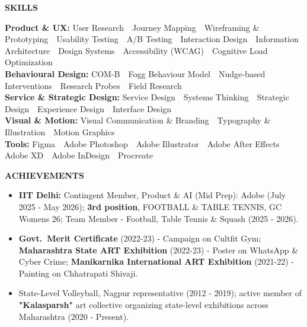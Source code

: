 \documentclass[10pt,a4paper]{article}
\newcommand{\cvsec}[1]{%
  \vspace{6pt}%
  {\color{accent}\large\bfseries\MakeUppercase{#1}}\par
  \vspace{1.5pt}{\color{ink}\hrule height 0.6pt}\vspace{4pt}\par
}
\begin{document}
\cvsec{Skills}

\textbf{Product \& UX:} User Research \,\textperiodcentered\, Journey Mapping \,\textperiodcentered\, Wireframing \& Prototyping \,\textperiodcentered\, Usability Testing \,\textperiodcentered\, A/B Testing \,\textperiodcentered\, Interaction Design \,\textperiodcentered\, Information Architecture \,\textperiodcentered\, Design Systems \,\textperiodcentered\, Accessibility (WCAG) \,\textperiodcentered\, Cognitive Load Optimization\\[3pt]
\textbf{Behavioural Design:} COM-B \,\textperiodcentered\, Fogg Behaviour Model \,\textperiodcentered\, Nudge-based Interventions \,\textperiodcentered\, Research Probes \,\textperiodcentered\, Field Research\\[3pt]
\textbf{Service \& Strategic Design:} Service Design \,\textperiodcentered\, Systems Thinking \,\textperiodcentered\, Strategic Design \,\textperiodcentered\, Experience Design \,\textperiodcentered\, Interface Design\\[3pt]
\textbf{Visual \& Motion:} Visual Communication \& Branding \,\textperiodcentered\, Typography \& Illustration \,\textperiodcentered\, Motion Graphics\\[3pt]
\textbf{Tools:} Figma \,\textperiodcentered\, Adobe Photoshop \,\textperiodcentered\, Adobe Illustrator \,\textperiodcentered\, Adobe After Effects \,\textperiodcentered\, Adobe XD \,\textperiodcentered\, Adobe InDesign \,\textperiodcentered\, Procreate

\cvsec{Achievements}

\begin{itemize}
  \item \textbf{IIT Delhi:} Contingent Member, Product \& AI (Mid Prep): Adobe (July 2025 - May 2026); \textbf{3rd position}, FOOTBALL \& TABLE TENNIS, GC Womens 26; Team Member - Football, Table Tennis \& Squash (2025 - 2026).
  \item \textbf{Govt.\ Merit Certificate} (2022-23) - Campaign on Cultfit Gym; \textbf{Maharashtra State ART Exhibition} (2022-23) - Poster on WhatsApp \& Cyber Crime; \textbf{Manikarnika International ART Exhibition} (2021-22) - Painting on Chhatrapati Shivaji.
  \item State-Level Volleyball, Nagpur representative (2012 - 2019); active member of \textbf{"Kalasparsh"} art collective organizing state-level exhibitions across Maharashtra (2020 - Present).
\end{itemize}
\end{document}
